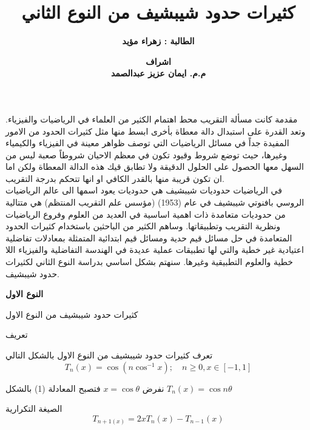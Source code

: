 


	\author{\textbf{الطالبة : زهراء مؤيد}}
	\title{\textbf{كثيرات حدود شيبشيف من النوع الثاني}}
	\date{\textbf{اشراف\\
		م.م. ايمان عزيز عبدالصمد}}
	
	\begin{frame}
		\maketitle
	\end{frame}
	
	\timesfont
	\begin{frame}{مقدمة}
		كانت مسألة التقريب محط اهتمام الكثير من العلماء في الرياضيات والفيزياء. وتعد القدرة على استبدال دالة معطاة بأخرى ابسط منها مثل كثيرات الحدود من الامور المفيدة جداً في مسائل الرياضيات التي توصف ظواهر معينة في الفيزياء والكيمياء وغيرها، حيث توضع شروط وقيود تكون في معظم الاحيان شروطاً صعبة ليس من السهل معها الحصول على الحلول الدقيقة ولا تطابق قيك هذه الدالة المعطاة ولكن اما ان تكون قريبة منها بالقدر الكافي او انها تتحكم بدرجة التقريب. \\[5pt]
		\pause
		في الرياضيات حدوديات شيبشيف هي حدوديات يعود اسمها الى عالم الرياضيات الروسي بافنوتي شيبشيف في عام (1953) (مؤسس علم التقريب المنتظم) هي متتالية من حدوديات متعامدة ذات اهمية اساسية في العديد من العلوم وفروع الرياضيات ونظرية التقريب وتطبيقاتها. وساهم الكثير من الباحثين باستخدام كثيرات الحدود المتعامدة في حل مسائل قيم حدية ومسائل قيم ابتدائية المتمثلة بمعادلات تفاضلية اعتيادية غير خطية والتي لها تطبيقات عملية عديدة في الهندسة التفاضلية والفيزياء اللا خطية والعلوم التطبيقية وغيرها. سنهتم بشكل اساسي بدراسة النوع الثاني لكثيرات حدود شيبشيف.  
	\end{frame}
	
		\begin{frame}
		\begin{center}
			\Huge
			\textbf{النوع الاول}
		\end{center}
	\end{frame}
	
	\begin{frame}{كثيرات حدود شيبشيف من  النوع الاول}
		\pause
		\begin{exampleblock}{ تعريف}
			
			تعرف كثيرات حدود شيبشيف من النوع الاول بالشكل التالي
			\begin{equation}
				T_n(x) = \cos(n\cos^{-1}x);\quad n\geq 0 , x\in [-1,1]
			\end{equation}
			
			\pause\noindent
			نفرض $x = \cos\theta$ فتصبح المعادلة (1) بالشكل $T_n(x) = \cos n\theta$
		\end{exampleblock}
		
		\pause
		\begin{exampleblock}{ الصيغة التكرارية}
				$$T_{n+1(x)} = 2xT_n(x) - T_{n-1}(x)$$ 
		\end{exampleblock}
	\end{frame}
	
